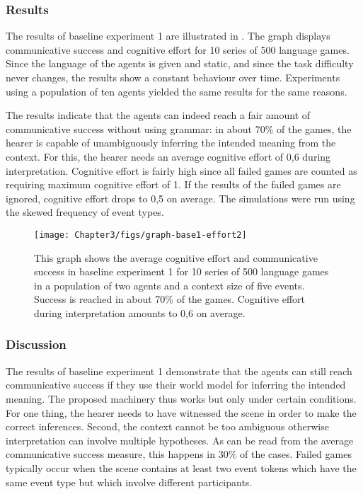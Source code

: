 \subsubsection{Results}
 The results of baseline experiment 1 are illustrated in . The graph displays communicative success and cognitive effort for 10 series of 500 language games. Since the language of the agents is given and static, and since the task difficulty never changes, the results show a constant behaviour over time. Experiments using a population of ten agents yielded the same results for the same reasons.

The results indicate that the agents can indeed reach a fair amount of communicative success without using grammar: in about 70\% of the games, the hearer is capable of unambiguously inferring the intended meaning from the context. For this, the hearer needs an average cognitive effort of 0,6 during interpretation. Cognitive effort is fairly high since all failed games are counted as requiring maximum cognitive effort of 1. If the results of the failed games are ignored, cognitive effort drops to 0,5 on average. The simulations were run using the skewed frequency of event types.

\begin{figure}[htb]
\centerline{\texttt{[image: Chapter3/figs/graph-base1-effort2]}}
  \caption[Baseline experiment 1: success and effort]{This graph shows the average cognitive effort and communicative success in baseline experiment 1 for 10 series of 500 language games in a population of two agents and a context size of five events. Success is reached in about 70\% of the games. Cognitive effort during interpretation amounts to 0,6 on average.}
   \label{f:base1-effort2}
\end{figure}


\subsubsection{Discussion}
 The results of baseline experiment 1 demonstrate that the agents can still reach communicative success if they use their world model for inferring the intended meaning. The proposed machinery thus works but only under certain conditions. For one thing, the hearer needs to have witnessed the scene in order to make the correct inferences. Second, the context cannot be too ambiguous otherwise interpretation can involve multiple hypotheses. As can be read from the average communicative success measure, this happens in 30\% of the cases. Failed games typically occur when the scene contains at least two event tokens which have the same event type but which involve different participants.

